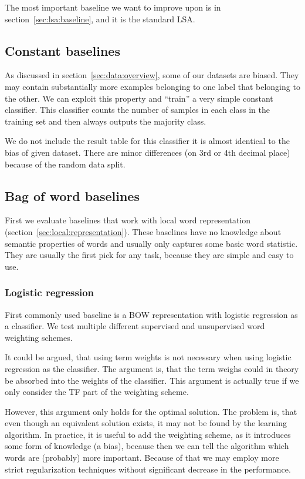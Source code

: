     The most important baseline we want to improve upon is in section~\ref{sec:lsa:baseline}, 
    and it is the standard LSA.

    \subsection{Constant baselines}
    
    As discussed in section~\ref{sec:data:overview}, some of our datasets are biased. 
    They may contain substantially more examples belonging to one label that belonging to the other.
    We can exploit this property and ``train'' a very simple constant classifier. 
    This classifier counts the number of samples in each class in the training set and then always outputs the majority class.
    
    We do not include the result table for this classifier it is almost identical to the bias of given dataset.
    There are minor differences (on 3rd or 4th decimal place) because of the random data split. 

    \subsection{Bag of word baselines}
    
    First we evaluate baselines that work with local word representation (section~\ref{sec:local:representation}).
    These baselines have no knowledge about semantic properties of words and usually only captures some basic word statistic.
    They are usually the first pick for any task, because they are simple and easy to use. 
    
    \subsubsection{Logistic regression}
    
    First commonly used baseline is a BOW representation with logistic regression as a classifier. 
    We test multiple different supervised and unsupervised word weighting schemes.
    
    It could be argued, that using term weights is not necessary when using logistic regression as the classifier.
    The argument is, that the term weighs could in theory be absorbed into the weights of the classifier. 
    This argument is actually true if we only consider the TF part of the weighting scheme.
    
    However, this argument only holds for the optimal solution. 
    The problem is, that even though an equivalent solution exists, it may not be found by the learning algorithm. 
    In practice, it is useful to add the weighting scheme, 
    as it introduces some form of knowledge (a bias), 
    because then we can tell the algorithm which words are (probably) more important.
    Because of that we may employ more strict regularization techniques without significant decrease in the performance.
    



